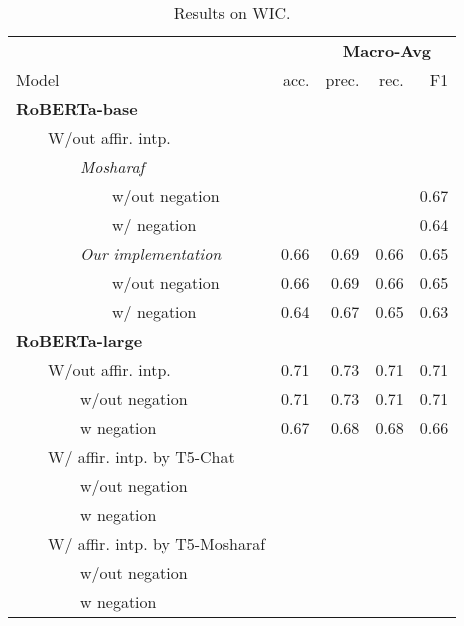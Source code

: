 \begin{table*}
\centering
\begin{tabular}{lrrrr}
\toprule
&& \multicolumn{3}{c}{\textbf{Macro-Avg}} \\
Model & acc. & prec. & rec. & F1 \\
\midrule
\textbf{RoBERTa-base} \\
~~~~W/out affir. intp. \\
~~~~~~~~\textit{Mosharaf} \\
~~~~~~~~~~~~w/out negation &&&&0.67\\ 
~~~~~~~~~~~~w/ negation &&&&0.64\\ 
\midrule
~~~~~~~~\textit{Our implementation}  & 0.66 & 0.69 & 0.66 & 0.65\\
~~~~~~~~~~~~w/out negation & 0.66 & 0.69 & 0.66 & 0.65 \\
~~~~~~~~~~~~w/ negation  & 0.64 & 0.67 & 0.65 & 0.63\\ 
\bottomrule
\textbf{RoBERTa-large} \\
~~~~W/out affir. intp.  & 0.71 & 0.73 & 0.71 & 0.71 \\
~~~~~~~~w/out negation  & 0.71 & 0.73 & 0.71 & 0.71 \\ 
~~~~~~~~w negation  & 0.67 & 0.68 & 0.68 & 0.66 \\ 
\midrule
~~~~W/ affir. intp. by T5-Chat \\
~~~~~~~~w/out negation \\ 
~~~~~~~~w negation \\ 
\midrule
~~~~W/ affir. intp. by T5-Mosharaf \\
~~~~~~~~w/out negation \\ 
~~~~~~~~w negation \\ 
\bottomrule
\end{tabular}
\caption{Results on WIC.}
\end{table*}